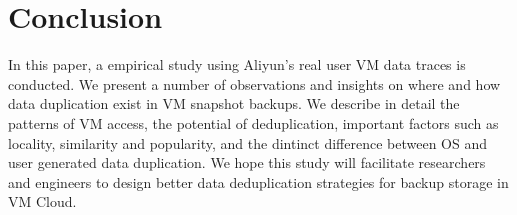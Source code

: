 \section{Conclusion}
In this paper, a empirical study using Aliyun's real user VM data traces is conducted. 
We present a number of observations and insights on where and how data duplication
exist in VM snapshot backups. We describe
in detail the patterns of VM access, the potential of deduplication, 
important factors such as locality, similarity and popularity, and
the dintinct difference between OS and user generated data duplication.
We hope this study will facilitate researchers and engineers to design better
data deduplication strategies
for backup storage in VM Cloud.